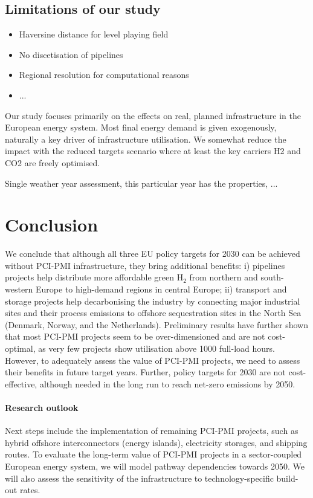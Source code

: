 \documentclass[preprint,12pt,sort&compress]{elsarticle}
\begin{document}
\subsection{Limitations of our study}
\begin{itemize}
  \item Haversine distance for level playing field
  \item No discetisation of pipelines
  \item Regional resolution for computational reasons
  \item ...
\end{itemize}

Our study focuses primarily on the effects on real, planned infrastructure in the European energy system. Most final energy demand is given exogenously, naturally a key driver of infrastructure utilisation. We somewhat reduce the impact with the reduced targets scenario where at least the key carriers H2 and CO2 are freely optimised.

Single weather year assessment, this particular year has the properties, ...

\newpage
\section{Conclusion}
\label{sec:conclusion}
We conclude that although all three EU policy targets for 2030 can be achieved without PCI-PMI infrastructure, they bring additional benefits: i)  pipelines projects help distribute more affordable green H$_2$ from northern and south-western Europe to high-demand regions in central Europe; ii)  transport and storage projects help decarbonising the industry by connecting major industrial sites and their process emissions to offshore sequestration sites in the North Sea (Denmark, Norway, and the Netherlands). Preliminary results have further shown that most PCI-PMI projects seem to be over-dimensioned and are not cost-optimal, as very few projects show utilisation above 1000 full-load hours. However, to adequately assess the value of PCI-PMI projects, we need to assess their benefits in future target years. Further, policy targets for 2030 are not cost-effective, although needed in the long run to reach net-zero emissions by 2050.

\paragraph{Research outlook} Next steps include the implementation of remaining PCI-PMI projects, such as hybrid offshore interconnectors (energy islands), electricity storages, and  shipping routes. To evaluate the long-term value of PCI-PMI projects in a sector-coupled European energy system, we will model pathway dependencies towards 2050. We will also assess the sensitivity of the infrastructure to technology-specific build-out rates.
\end{document}
